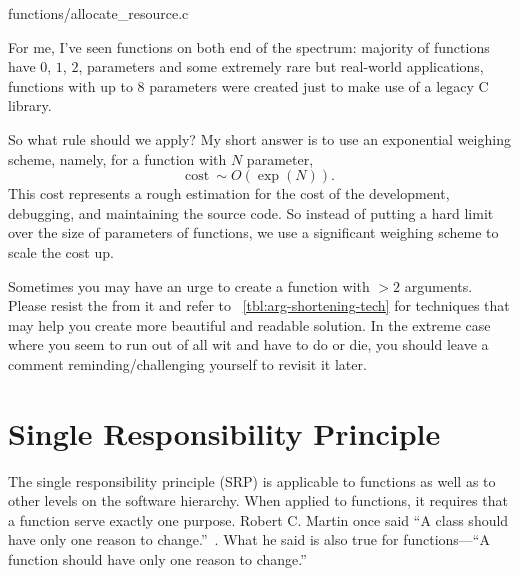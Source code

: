 \begin{clisting}
    
    {functions/allocate_resource.c}
\end{clisting}

For me, I've seen functions on both end of the spectrum: majority of functions have $0$, $1$, $2$,
parameters and some extremely rare but real-world applications, functions with up to $8$
parameters were created just to make use of a legacy C library.

So what rule should we apply?
My short answer is to use an exponential weighing scheme, namely, for a function
with $N$ parameter,
\begin{equation}
    \mbox{cost}~\sim O(\exp(N)).
\end{equation}
This cost represents a rough estimation for the cost of the development, debugging, and maintaining
the source code.
So instead of putting a hard limit over the size of parameters of functions, we use a significant
weighing scheme to scale the cost up.

Sometimes you may have an urge to create a function with $>2$ arguments.
Please resist the from it and refer to ~\autoref{tbl:arg-shortening-tech} for techniques that may
help you create more beautiful and readable solution.
In the extreme case where you seem to run out of all wit and have to do or die,
you should leave a comment reminding/challenging yourself to revisit it later.


\section{Single Responsibility Principle}\label{sec:function-modularity}

The single responsibility principle (SRP) is applicable to functions as well as to other levels
on the software hierarchy.
When applied to functions, it requires that a function serve exactly one purpose.
Robert C. Martin once said ``A class should have only one reason to change.''~\cite{Martin-R-2003}.
What he said is also true for functions---``A function should have only one reason to change.''


